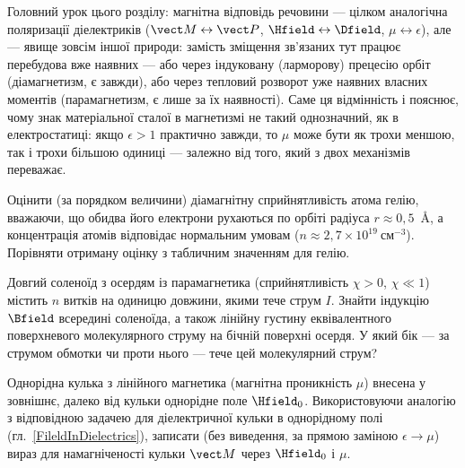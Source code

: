 \begin{Attention}
	Головний урок цього розділу: магнітна відповідь речовини ---  цілком аналогічна поляризації діелектриків ($\Mfield
	\leftrightarrow \vect P$, $\Hfield \leftrightarrow \Dfield$, $\mu \leftrightarrow \epsilon$), але  --- явище зовсім
	іншої природи: замість зміщення зв'язаних  тут працює перебудова вже наявних  --- або через індуковану
	(ларморову) прецесію орбіт (діамагнетизм, є завжди), або через тепловий розворот уже наявних власних моментів (парамагнетизм, є лише за їх
	наявності). Саме ця відмінність і пояснює, чому знак матеріальної сталої в магнетизмі не такий однозначний, як в електростатиці: якщо
	$\epsilon>1$ практично завжди, то $\mu$ може бути як трохи меншою, так і трохи більшою одиниці --- залежно від того, який з двох механізмів
	переважає.
\end{Attention}

\begin{problem}
Оцінити (за порядком величини) діамагнітну сприйнятливість атома гелію, вважаючи, що обидва його електрони рухаються по орбіті радіуса
$r\approx0{,}5$~\AA, а концентрація атомів відповідає нормальним умовам ($n\approx2{,}7\times10^{19}\ \text{см}^{-3}$). Порівняти отриману оцінку
з табличним значенням для гелію.
\end{problem}

\begin{problem}
Довгий соленоїд з осердям із парамагнетика (сприйнятливість $\chi>0$, $\chi\ll1$) містить $n$ витків на одиницю довжини, якими тече струм $I$.
Знайти індукцію $\Bfield$ всередині соленоїда, а також лінійну густину еквівалентного поверхневого молекулярного струму на бічній поверхні
осердя. У який бік --- за струмом обмотки чи проти нього --- тече цей молекулярний струм?
\end{problem}

\begin{problem}\label{prb:DiaSphere}
Однорідна кулька з лінійного магнетика (магнітна проникність $\mu$) внесена у зовнішнє, далеко від кульки однорідне поле $\Hfield_0$.
Використовуючи аналогію з відповідною задачею для діелектричної кульки в однорідному полі (гл.~\ref{FileldInDielectrics}), записати (без
виведення, за прямою заміною $\epsilon\to\mu$) вираз для намагніченості кульки $\Mfield$ через $\Hfield_0$ і $\mu$.
\end{problem}
